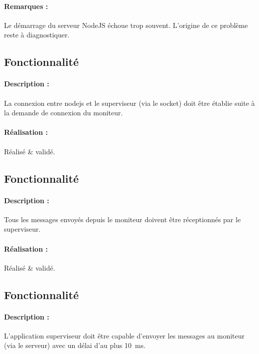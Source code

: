 \documentclass[11pt, a4paper]{paper}
\newcounter{cptreq}
\begin{document}
\paragraph{\color{black}Remarques :}  {\color{black} Le démarrage du serveur NodeJS échoue trop souvent. L'origine de ce problème reste à diagnostiquer.}

\subsection{Fonctionnalité \thecptreq}

\paragraph{Description :} La connexion entre nodejs et le superviseur (via le socket) doit être établie suite à la demande de connexion du moniteur.

\paragraph{\color{black}Réalisation :}  {\color{black} Réalisé \& validé.}


\subsection{Fonctionnalité \thecptreq}

\paragraph{Description :} Tous les messages envoyés depuis le moniteur doivent être réceptionnés par le superviseur.

\paragraph{\color{black}Réalisation :} {\color{black} Réalisé \& validé.}
\subsection{Fonctionnalité \thecptreq}

\paragraph{Description :} L'application superviseur doit être capable d'envoyer les messages au moniteur (via le serveur) avec un délai d'au plus 10~ms.
\end{document}
